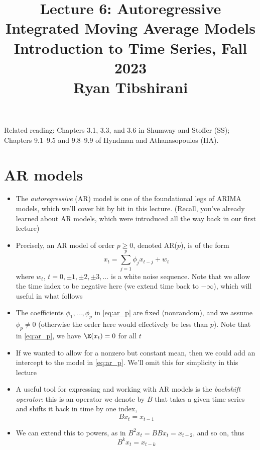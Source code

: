 \documentclass{article}
\title{Lecture 6: Autoregressive Integrated Moving Average Models \\ \smallskip  
\large Introduction to Time Series, Fall 2023 \\ \smallskip
Ryan Tibshirani}
\date{}
\begin{document}
\maketitle
\RaggedRight
\vspace{-50pt}

Related reading: Chapters 3.1, 3.3, and 3.6 in Shumway and Stoffer (SS);
Chapters 9.1--9.5 and 9.8--9.9 of Hyndman and Athanasopoulos (HA).   

\section{AR models}

\begin{itemize}
\item The \emph{autoregressive} (AR) model is one of the foundational legs of
  ARIMA models, which we'll cover bit by bit in this lecture. (Recall, you've
  already learned about AR models, which were introduced all the way back in our 
  first lecture)  

\item Precisely, an AR model of order $p \geq 0$, denoted AR($p$), is of the
  form 
  \begin{equation}
  \label{eq:ar_p}
  x_t = \sum_{j=1}^p \phi_j x_{t-j} + w_t
  \end{equation}
  where $w_t$, $t = 0, \pm 1, \pm 2, \pm 3, \dots$ is a white noise
  sequence. Note that we allow the time index to be negative here (we extend
  time back to $-\infty$), which will useful in what follows 

\item The coefficients $\phi_1,\dots,\phi_p$ in \eqref{eq:ar_p} are fixed
  (nonrandom), and we assume $\phi_p \not= 0$ (otherwise the order here would
  effectively be less than $p$). Note that in \eqref{eq:ar_p}, we have $\E(x_t)
  = 0$ for all $t$

\item If we wanted to allow for a nonzero but constant mean, then we could add
  an intercept to the model in \eqref{eq:ar_p}. We'll omit this for simplicity
  in this lecture  

\item A useful tool for expressing and working with AR models is the
  \emph{backshift operator}: this is an operator we denote by $B$ that takes a 
  given time series and shifts it back in time by one index,
  \[
  B x_t = x_{t-1}
  \]

\item We can extend this to powers, as in $B^2 x_t = B B x_t = x_{t-2}$, and so
  on, thus   
  \[
  B^k x_t = x_{t-k} 
  \]


\end{itemize}
\end{document}
